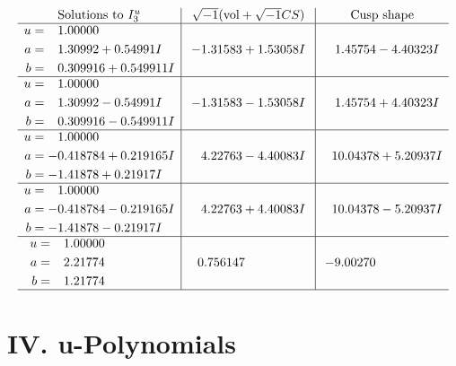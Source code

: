 \documentclass[1p]{elsarticle_modified}
\theoremstyle{definition}
\newcommand{\I}{\sqrt{-1}}
\begin{document}
$$\begin{array}{c|c|c}  
\text{Solutions to }I^u_{3}& \I (\text{vol} + \sqrt{-1}CS) & \text{Cusp shape}\\
 \hline 
\begin{aligned}
u &= \phantom{-}1.00000\phantom{ +0.000000I} \\
a &= \phantom{-}1.30992 + 0.54991 I \\
b &= \phantom{-}0.309916 + 0.549911 I\end{aligned}
 & -1.31583 + 1.53058 I & \phantom{-}1.45754 - 4.40323 I \\ \hline\begin{aligned}
u &= \phantom{-}1.00000\phantom{ +0.000000I} \\
a &= \phantom{-}1.30992 - 0.54991 I \\
b &= \phantom{-}0.309916 - 0.549911 I\end{aligned}
 & -1.31583 - 1.53058 I & \phantom{-}1.45754 + 4.40323 I \\ \hline\begin{aligned}
u &= \phantom{-}1.00000\phantom{ +0.000000I} \\
a &= -0.418784 + 0.219165 I \\
b &= -1.41878 + 0.21917 I\end{aligned}
 & \phantom{-}4.22763 - 4.40083 I & \phantom{-}10.04378 + 5.20937 I \\ \hline\begin{aligned}
u &= \phantom{-}1.00000\phantom{ +0.000000I} \\
a &= -0.418784 - 0.219165 I \\
b &= -1.41878 - 0.21917 I\end{aligned}
 & \phantom{-}4.22763 + 4.40083 I & \phantom{-}10.04378 - 5.20937 I \\ \hline\begin{aligned}
u &= \phantom{-}1.00000\phantom{ +0.000000I} \\
a &= \phantom{-}2.21774\phantom{ +0.000000I} \\
b &= \phantom{-}1.21774\phantom{ +0.000000I}\end{aligned}
 & \phantom{-}0.756147\phantom{ +0.000000I} & -9.00270\phantom{ +0.000000I}\\
 \hline 
 \end{array}$$\newpage
\newpage\renewcommand{\arraystretch}{1}
\centering \section*{ IV. u-Polynomials}
\end{document}
